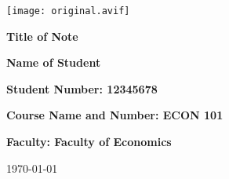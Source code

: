
\begin{titlepage}
    \centering %

    \texttt{[image: original.avif]} %
    \vspace{1cm} %

    {\Huge\bfseries Title of Note\par}
    \vspace{1.5cm} %

    {\Large\bfseries Name of Student\par}
    \vspace{0.5cm} %

    {\Large\bfseries Student Number: 12345678\par}
    \vspace{0.5cm} %

    {\Large\bfseries Course Name and Number: ECON 101\par}
    \vspace{0.5cm} %

    {\Large\bfseries Faculty: Faculty of Economics\par}
    \vspace{1.5cm} %

    {\Large \today\par} %
    \vfill %
\end{titlepage}
